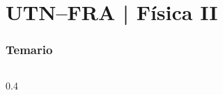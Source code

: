 \documentclass[aspectratio=169]{beamer} %
\begin{document}




\section{UTN--FRA | Física II}
\begin{frame}
	\frametitle{Temario}
	\begin{columns}
		\begin{column}{0.4 \textwidth}
			\begin{block}{}
				\vspace{0.2cm}
				\tableofcontents[currentsection]
			\end{block}
		\end{column}
	\end{columns}
\end{frame}
\end{document}
